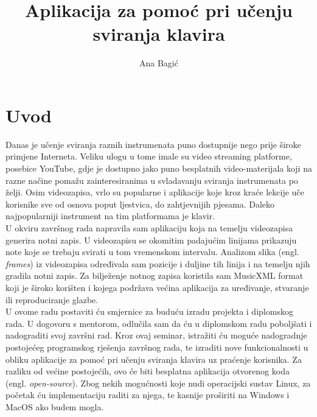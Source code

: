 \documentclass[times, utf8, seminar, numeric]{fer}
\begin{document}
\title{Aplikacija za pomoć pri učenju sviranja klavira}

\author{Ana Bagić}


\maketitle

\tableofcontents

\chapter{Uvod}
Danas je učenje sviranja raznih instrumenata puno dostupnije nego prije široke primjene Interneta. Veliku ulogu u tome imale su video streaming platforme, posebice YouTube, gdje je dostupno jako puno besplatnih video-materijala koji na razne načine pomažu zainteresiranima u svladavanju sviranja instrumenata po želji. Osim videozapisa, vrlo su popularne i aplikacije koje kroz kraće lekcije uče korisnike sve od osnova poput ljestvica, do zahtjevnijih pjesama. Daleko najpopularniji instrument na tim platformama je klavir.\\

U okviru završnog rada napravila sam aplikaciju koja na temelju videozapisa generira notni zapis. U videozapisu se okomitim padajućim linijama prikazuju note koje se trebaju svirati u tom vremenskom intervalu. Analizom slika (engl. \textit{frames}) iz videozapisa određivala sam pozicije i duljine tih linija i na temelju njih gradila notni zapis. Za bilježenje notnog zapisa koristila sam MusicXML\cite{musicxml} format koji je široko korišten i kojega podržava većina aplikacija za uređivanje, stvaranje ili reproduciranje glazbe.\\

U ovome radu postaviti ću smjernice za buduću izradu projekta i diplomskog rada. U dogovoru s mentorom, odlučila sam da ću u diplomskom radu poboljšati i nadograditi svoj završni rad. Kroz ovaj seminar, istražiti ću moguće nadogradnje postojećeg programskog rješenja završnog rada, te izraditi nove funkcionalnosti u obliku aplikacije za pomoć pri učenju sviranja klavira uz praćenje korisnika. Za razliku od većine postojećih, ovo će biti besplatna aplikacija otvorenog koda (engl. \textit{open-source}). Zbog nekih mogućnosti koje nudi operacijski sustav Linux, za početak ću implementaciju raditi za njega, te kasnije proširiti na Windows i MacOS ako budem mogla.
\end{document}
